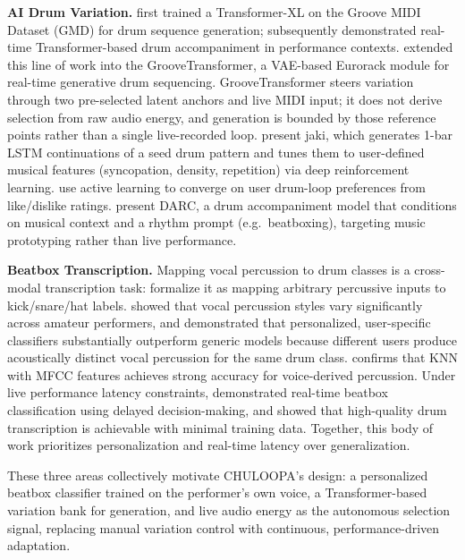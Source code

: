 \documentclass{aimc2026}
\begin{document}
\textbf{AI Drum Variation.} \citet{nuttall2021transformer} first trained a Transformer-XL on the Groove MIDI Dataset (GMD) for drum sequence generation; \citet{haki2022realtime} subsequently demonstrated real-time Transformer-based drum accompaniment in performance contexts. \citet{evans2024groovetransformer} extended this line of work into the GrooveTransformer, a VAE-based Eurorack module for real-time generative drum sequencing. GrooveTransformer steers variation through two pre-selected latent anchors and live MIDI input; it does not derive selection from raw audio energy, and generation is bounded by those reference points rather than a single live-recorded loop. \citet{bruford2020jaki} present jaki, which generates 1-bar LSTM continuations of a seed drum pattern and tunes them to user-defined musical features (syncopation, density, repetition) via deep reinforcement learning. \citet{alain2020deepdrummer} use active learning to converge on user drum-loop preferences from like/dislike ratings. \citet{brosnan2026darc} present DARC, a drum accompaniment model that conditions on musical context and a rhythm prompt (e.g.\ beatboxing), targeting music prototyping rather than live performance.

\textbf{Beatbox Transcription.} Mapping vocal percussion to drum classes is a cross-modal transcription task: \citet{santos2025tapscription} formalize it as mapping arbitrary percussive inputs to kick/snare/hat labels. \citet{delgado2019dataset} showed that vocal percussion styles vary significantly across amateur performers, and \citet{ramires2018user} demonstrated that personalized, user-specific classifiers substantially outperform generic models because different users produce acoustically distinct vocal percussion for the same drum class. \citet{martanto2025beatbox} confirms that KNN with MFCC features achieves strong accuracy for voice-derived percussion. Under live performance latency constraints, \citet{stowell2010beatbox} demonstrated real-time beatbox classification using delayed decision-making, and \citet{weber2024realtime} showed that high-quality drum transcription is achievable with minimal training data. Together, this body of work prioritizes personalization and real-time latency over generalization.

These three areas collectively motivate CHULOOPA's design: a personalized beatbox classifier trained on the performer's own voice, a Transformer-based variation bank for generation, and live audio energy as the autonomous selection signal, replacing manual variation control with continuous, performance-driven adaptation.
\end{document}
